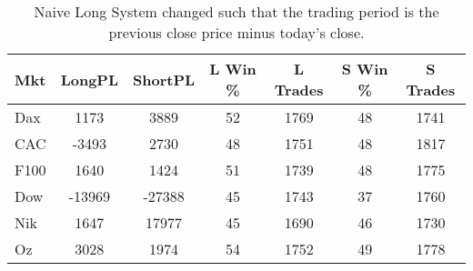 \begin{table}[ht]
\centering
\caption[Naive Long System - Close to Close]{Naive Long System changed such that the trading period is the previous close price minus today's close.} 
\label{tab:stoch_results_sloss}
\begin{tabular}{lcccccc}
  \toprule Mkt & LongPL & ShortPL & L Win \% & L Trades & S Win \% & S Trades \\ 
  \midrule Dax & 1173 & 3889 & 52 & 1769 & 48 & 1741 \\ 
  CAC & -3493 & 2730 & 48 & 1751 & 48 & 1817 \\ 
  F100 & 1640 & 1424 & 51 & 1739 & 48 & 1775 \\ 
  Dow & -13969 & -27388 & 45 & 1743 & 37 & 1760 \\ 
  Nik & 1647 & 17977 & 45 & 1690 & 46 & 1730 \\ 
  Oz & 3028 & 1974 & 54 & 1752 & 49 & 1778 \\ 
   \bottomrule \end{tabular}
\end{table}
